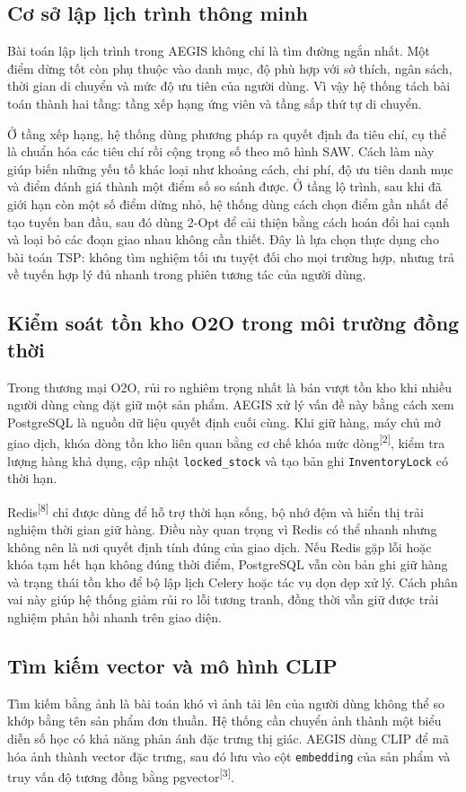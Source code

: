 \documentclass[12pt, a4paper]{article}
\begin{document}
\subsection{Cơ sở lập lịch trình thông minh}
\label{sec:tech_planner}
Bài toán lập lịch trình trong AEGIS không chỉ là tìm đường ngắn nhất. Một điểm dừng tốt còn phụ thuộc vào danh mục, độ phù hợp với sở thích, ngân sách, thời gian di chuyển và mức độ ưu tiên của người dùng. Vì vậy hệ thống tách bài toán thành hai tầng: tầng xếp hạng ứng viên và tầng sắp thứ tự di chuyển.

Ở tầng xếp hạng, hệ thống dùng phương pháp ra quyết định đa tiêu chí, cụ thể là chuẩn hóa các tiêu chí rồi cộng trọng số theo mô hình SAW. Cách làm này giúp biến những yếu tố khác loại như khoảng cách, chi phí, độ ưu tiên danh mục và điểm đánh giá thành một điểm số so sánh được. Ở tầng lộ trình, sau khi đã giới hạn còn một số điểm dừng nhỏ, hệ thống dùng cách chọn điểm gần nhất để tạo tuyến ban đầu, sau đó dùng 2-Opt để cải thiện bằng cách hoán đổi hai cạnh và loại bỏ các đoạn giao nhau không cần thiết. Đây là lựa chọn thực dụng cho bài toán TSP: không tìm nghiệm tối ưu tuyệt đối cho mọi trường hợp, nhưng trả về tuyến hợp lý đủ nhanh trong phiên tương tác của người dùng.

\subsection{Kiểm soát tồn kho O2O trong môi trường đồng thời}
\label{sec:tech_inventory}
Trong thương mại O2O, rủi ro nghiêm trọng nhất là bán vượt tồn kho khi nhiều người dùng cùng đặt giữ một sản phẩm. AEGIS xử lý vấn đề này bằng cách xem PostgreSQL là nguồn dữ liệu quyết định cuối cùng. Khi giữ hàng, máy chủ mở giao dịch, khóa dòng tồn kho liên quan bằng cơ chế khóa mức dòng\textsuperscript{[2]}, kiểm tra lượng hàng khả dụng, cập nhật \texttt{locked\_stock} và tạo bản ghi \texttt{InventoryLock} có thời hạn.

Redis\textsuperscript{[8]} chỉ được dùng để hỗ trợ thời hạn sống, bộ nhớ đệm và hiển thị trải nghiệm thời gian giữ hàng. Điều này quan trọng vì Redis có thể nhanh nhưng không nên là nơi quyết định tính đúng của giao dịch. Nếu Redis gặp lỗi hoặc khóa tạm hết hạn không đúng thời điểm, PostgreSQL vẫn còn bản ghi giữ hàng và trạng thái tồn kho để bộ lập lịch Celery hoặc tác vụ dọn dẹp xử lý. Cách phân vai này giúp hệ thống giảm rủi ro lỗi tương tranh, đồng thời vẫn giữ được trải nghiệm phản hồi nhanh trên giao diện.

\subsection{Tìm kiếm vector và mô hình CLIP}
\label{sec:tech_vision}
Tìm kiếm bằng ảnh là bài toán khó vì ảnh tải lên của người dùng không thể so khớp bằng tên sản phẩm đơn thuần. Hệ thống cần chuyển ảnh thành một biểu diễn số học có khả năng phản ánh đặc trưng thị giác. AEGIS dùng CLIP để mã hóa ảnh thành vector đặc trưng, sau đó lưu vào cột \texttt{embedding} của sản phẩm và truy vấn độ tương đồng bằng pgvector\textsuperscript{[3]}.
\end{document}
